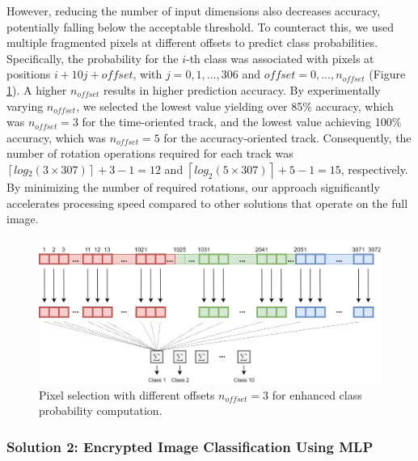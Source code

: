\documentclass[article]{iacrtrans}
\begin{document}
However, reducing the number of input dimensions also decreases accuracy, potentially falling below the acceptable threshold. To counteract this, we used multiple fragmented pixels at different offsets to predict class probabilities. Specifically, the probability for the $i$-th class was associated with pixels at positions $i+10j+offset$, with $j=0,1,\dots,306$ and $offset=0,\dots,n_{offset}$ (Figure \ref{fig:pixel-selection2}). A higher $n_{offset}$ results in higher prediction accuracy. By experimentally varying $n_{offset}$, we selected the lowest value yielding over 85\% accuracy, which was $n_{offset} = 3$ for the time-oriented track, and the lowest value achieving 100\% accuracy, which was $n_{offset} = 5$ for the accuracy-oriented track. Consequently, the number of rotation operations required for each track was $\left\lceil log⁡_2(3 \times 307) \right\rceil+3-1=12$ and $ \left \lceil log_{⁡2}(5 \times 307) \right \rceil+5-1=15$, respectively. By minimizing the number of required rotations, our approach significantly accelerates processing speed compared to other solutions that operate on the full image.
\begin{figure}[H]
 \centering
 \includegraphics[width=1\linewidth]{figures_cifar/pixel_selection_2.png}
 \caption{Pixel selection with different offsets $n_{offset} = 3$ for enhanced class probability computation.}
 \label{fig:pixel-selection2}
\end{figure}

\subsubsection{Solution 2: Encrypted Image Classification Using MLP}
\end{document}
